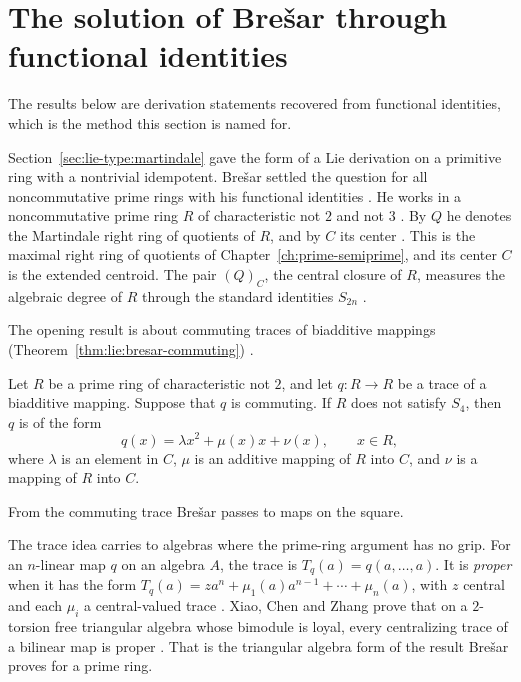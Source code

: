 \section{The solution of Brešar through functional identities}\label{sec:lie-type:bresar}

The results below are derivation statements recovered from functional identities, which is the method this section is named for.

Section~\ref{sec:lie-type:martindale} gave the form of a Lie derivation on a primitive
ring with a nontrivial idempotent. Brešar settled the question for all noncommutative
prime rings with his functional identities \cite[p.~525]{Bresar1993LieTAMS}. He
works in a noncommutative prime ring
$R$ of characteristic not $2$ and not $3$ \cite[p.~525]{Bresar1993LieTAMS}. By $Q$
he denotes the Martindale right ring of quotients of $R$, and by $C$ its center
\cite[p.~525]{Bresar1993LieTAMS}. This is the maximal right ring of quotients of
Chapter~\ref{ch:prime-semiprime}, and its center $C$ is the extended centroid. The
pair $(Q)_{C}$, the central closure of $R$, measures the algebraic degree of $R$
through the standard identities $S_{2n}$ \cite[p.~526]{Bresar1993LieTAMS}.

The opening result is about commuting traces of biadditive mappings (Theorem~\ref{thm:lie:bresar-commuting}) \cite[Theorem~1, p.~527]{Bresar1993LieTAMS}.

\begin{theorem}\label{thm:lie:bresar-commuting}
Let $R$ be a prime ring of characteristic not $2$, and let $q\colon R\to R$ be a
trace of a biadditive mapping. Suppose that $q$ is commuting. If $R$ does not
satisfy $S_{4}$, then $q$ is of the form
\[
q(x)=\lambda x^{2}+\mu(x)x+\nu(x),\qquad x\in R,
\]
where $\lambda$ is an element in $C$, $\mu$ is an additive mapping of $R$ into $C$,
and $\nu$ is a mapping of $R$ into $C$.
\end{theorem}

From the commuting trace Brešar passes to maps on the square.

The trace idea carries to algebras where the prime-ring argument has no grip.
For an $n$-linear map $q$ on an algebra $A$, the trace is
$T_{q}(a)=q(a,\dots,a)$. It is \emph{proper} when it has the form
$T_{q}(a)=za^{n}+\mu_{1}(a)a^{n-1}+\cdots+\mu_{n}(a)$, with $z$ central and each
$\mu_{i}$ a central-valued trace \cite[p.~2]{XiaoChenZhang2015Centralizing}.
Xiao, Chen and Zhang prove that on a $2$-torsion free triangular algebra whose
bimodule is loyal, every centralizing trace of a bilinear map is proper
\cite[Theorem~3.4]{XiaoChenZhang2015Centralizing}. That is the triangular algebra
form of the result Brešar proves for a prime ring. %

